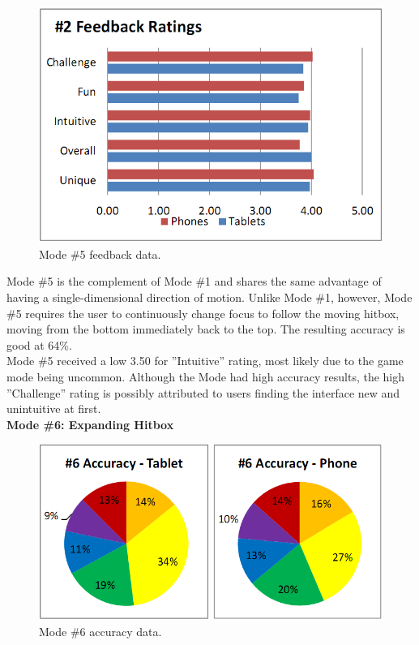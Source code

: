 \documentclass{sig-alternate}
\begin{document}
\begin{figure}[htb!]
	\begin{center}
		\includegraphics[width=1\linewidth]{figure_chart_rating_5}
	\end{center}
	\vspace{-12pt}
	\caption{Mode \#5 feedback data.}
	\label{fig:chart_rating_5}
\end{figure}

Mode \#5  is the complement of Mode \#1 and shares the same advantage of having a single-dimensional direction of motion. Unlike Mode \#1, however, Mode \#5 requires the user to continuously change focus to follow the moving hitbox, moving from the bottom immediately back to the top. The resulting accuracy is good at 64\%. \\

Mode \#5 received a low 3.50 for ''Intuitive'' rating, most likely due to the game mode being uncommon. Although the Mode had high accuracy results, the high ''Challenge'' rating is possibly attributed to users finding the interface new and unintuitive at first. \\

\newpage
\noindent \textbf{Mode \#6: Expanding Hitbox}

\begin{figure}[htb!]
	\begin{center}
		\includegraphics[width=1\linewidth]{figure_chart_accuracy_6}
	\end{center}
	\vspace{-12pt}
	\caption{Mode \#6 accuracy data.}
	\label{fig:chart_accuracy_6}
\end{figure}
\end{document}
